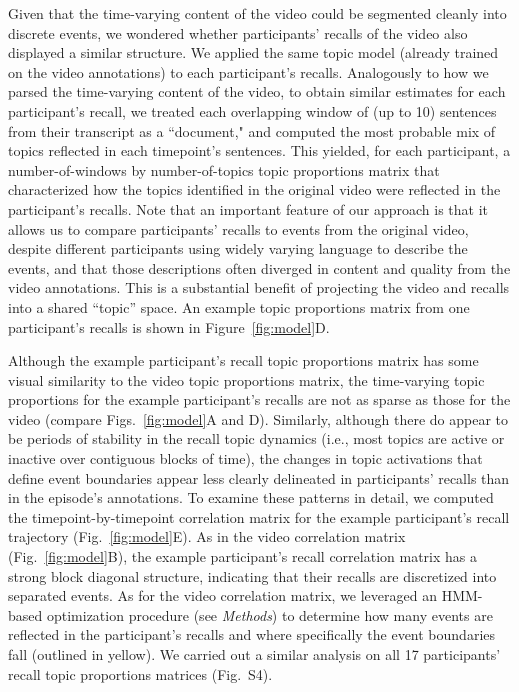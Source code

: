 \documentclass{article}
\newcommand{\corrmats}{S4}
\begin{document}
Given that the time-varying content of the video could be segmented cleanly into discrete events, we wondered whether participants' recalls of the video also displayed a similar structure.  We applied the same topic model (already trained on the video annotations) to each participant's recalls.  Analogously to how we parsed the time-varying content of the video, to obtain similar estimates for each participant's recall, we treated each overlapping  window of (up to 10) sentences from their transcript as a ``document," and computed the most probable mix of topics reflected in each timepoint's sentences.  This yielded, for each participant, a number-of-windows by number-of-topics topic proportions matrix that characterized how the topics identified in the original video were reflected in the participant's recalls.  Note that an important feature of our approach is that it allows us to compare participants' recalls to events from the original video, despite different participants using widely varying language to describe the events, and that those descriptions often diverged in content and quality from the video annotations.  This is a substantial benefit of projecting the video and recalls into a shared ``topic'' space.  An example topic proportions matrix from one participant's recalls is shown in Figure~\ref{fig:model}D.

Although the example participant's recall topic proportions matrix has some visual similarity to the video topic proportions matrix, the time-varying topic proportions for the example participant's recalls are not as sparse as those for the video (compare Figs.~\ref{fig:model}A and D).  Similarly, although there do appear to be periods of stability in the recall topic dynamics (i.e., most topics are active or inactive over contiguous blocks of time), the changes in topic activations that define event boundaries appear less clearly delineated in participants' recalls than in the episode's annotations.  To examine these patterns in detail, we computed the timepoint-by-timepoint correlation matrix for the example participant's recall trajectory (Fig.~\ref{fig:model}E).  As in the video correlation matrix (Fig.~\ref{fig:model}B), the example participant's recall correlation matrix has a strong block diagonal structure, indicating that their recalls are discretized into separated events.  As for the video correlation matrix, we leveraged an HMM-based optimization procedure (see \textit{Methods}) to determine how many events are reflected in the participant's recalls and where specifically the event boundaries fall (outlined in yellow).  We carried out a similar analysis on all 17 participants' recall topic proportions matrices (Fig.~\corrmats).
\end{document}
